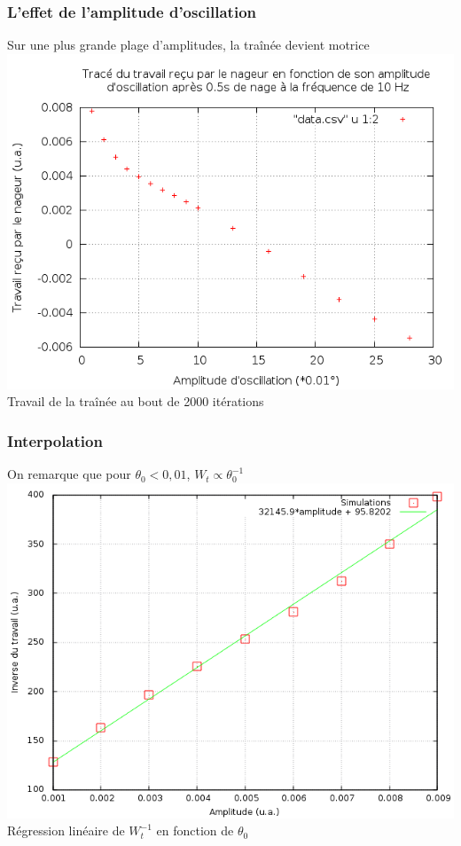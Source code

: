 \documentclass{beamer}
\begin{document}
 	\begin{frame}
 		\frametitle{L'effet de l'amplitude d'oscillation}
 		Sur une plus grande plage d'amplitudes, la traînée devient motrice
 		\centering \includegraphics[width= 0.8 \linewidth]{bcp_points.png}\\
 		Travail de la traînée au bout de 2000 itérations
 	\end{frame}
  
  	\begin{frame}
 		\frametitle{Interpolation}
 		On remarque que pour $ \theta_0 < 0,01$, $W_t \propto \theta_0^{-1}$
 		\centering \includegraphics[width= 0.8 \linewidth]{9_courbes_extraites.png}\\
 		Régression linéaire de $W_t^{-1}$ en fonction de $\theta_0$
 	\end{frame}
 	
\end{document}

